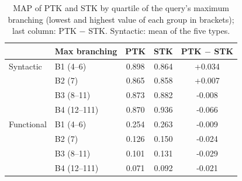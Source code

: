 \begin{table}[!htbp]
\centering
\caption{MAP of PTK and STK by quartile of the query's maximum branching (lowest and highest value of each group in brackets); last column: PTK $-$ STK. Syntactic: mean of the five types.}
\label{tab:d3}
\footnotesize
\setlength{\tabcolsep}{3pt}
\begin{tabular}{llccc}
\toprule
 & Max branching & PTK & STK & PTK $-$ STK \\
\midrule
Syntactic & B1 (4--6) & 0.898 & 0.864 & +0.034 \\
 & B2 (7) & 0.865 & 0.858 & +0.007 \\
 & B3 (8--11) & 0.873 & 0.882 & -0.008 \\
 & B4 (12--111) & 0.870 & 0.936 & -0.066 \\
\midrule
Functional & B1 (4--6) & 0.254 & 0.263 & -0.009 \\
 & B2 (7) & 0.126 & 0.150 & -0.024 \\
 & B3 (8--11) & 0.101 & 0.131 & -0.029 \\
 & B4 (12--111) & 0.071 & 0.092 & -0.021 \\
\bottomrule
\end{tabular}
\end{table}
